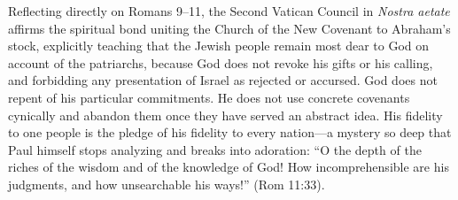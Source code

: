 Reflecting directly on Romans 9--11, the Second Vatican Council in \textit{Nostra aetate} affirms the spiritual bond uniting the Church of the New Covenant to Abraham's stock, explicitly teaching that the Jewish people remain most dear to God on account of the patriarchs, because God does not revoke his gifts or his calling, and forbidding any presentation of Israel as rejected or accursed. God does not repent of his particular commitments. He does not use concrete covenants cynically and abandon them once they have served an abstract idea. His fidelity to one people is the pledge of his fidelity to every nation---a mystery so deep that Paul himself stops analyzing and breaks into adoration: ``O the depth of the riches of the wisdom and of the knowledge of God! How incomprehensible are his judgments, and how unsearchable his ways!'' (Rom 11:33).
